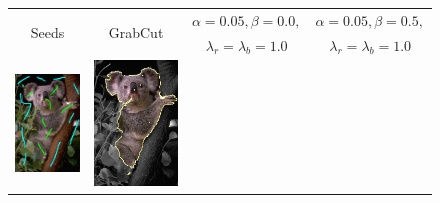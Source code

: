\begin{figure}
\center
\begin{tabular}{cccc}
\multirow{2}{*}{Seeds} & \multirow{2}{*}{GrabCut} & $\alpha=0.05, \beta=0.0,$ & $\alpha=0.05, \beta=0.5,$\\
& & $\lambda_r=\lambda_b=1.0$ & $\lambda_r=\lambda_b=1.0$\\
 	\includegraphics[scale=0.25]{figures/chapter8/segmentation/coala/k-0.0/seeds.png} & 
 	\includegraphics[scale=0.25]{figures/chapter8/segmentation/coala/k-0.0/gc-seg.png} &  	

\end{tabular}
\end{figure}

